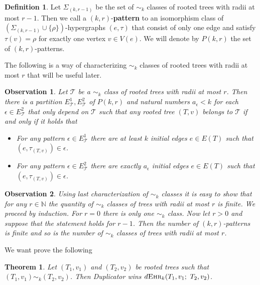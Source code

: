 \documentclass[12pt,notitlepage,a4paper]{article}
\newtheorem{theorem}{Theorem}[section]
\newtheorem{obs}{Observation}[section]
\theoremstyle{definition}
\newtheorem{definition}{Definition}[section]
\newcommand{\N}{\mathbb{N}}
\newcommand{\ehr}{\textsc{Ehr}}
\begin{document}
\begin{definition}
	Let $\Sigma_{(k,r-1)}$ be the set of $\sim_k$ classes
	of rooted trees with radii at most $r-1$. Then
	we call a $(k,r)$-\textbf{pattern} to an isomorphism class
	of $(\Sigma_{(k,r-1)}\cup \{\rho \})$-hypergraphs 
	$(e,\tau)$ that consist of only one edge and satisfy 
	$\tau(v)=\rho$ for exactly one vertex $v\in V(e)$. We will
	denote by $P(k,r)$ the set of $(k,r)$-patterns.
\end{definition}

The following is a way of characterizing $\sim_k$ classes
of rooted trees with radii at most $r$ that will be useful later. 

\begin{obs}\label{obs:equivalenttrees}
Let $\mathcal{T}$ be a $\sim_k$ class of rooted trees with
radii at most $r$. Then there is a partition $E^1_\mathcal{T},
E^2_\mathcal{T}$ of $P(k,r)$ and natural numbers $a_\epsilon<k$
for each $\epsilon\in E^2_\mathcal{T}$ that only depend on 
$\mathcal{T}$ such that any rooted tree $(T,v)$ belongs to
$\mathcal{T}$ if and only if it holds that
\begin{itemize}
	\item[(1)] For any pattern $\epsilon\in E^1_\mathcal{T}$ there are at least
	$k$ initial edges $e\in E(T)$ such that
	$(e,\tau_{(T,v)})\in \epsilon$. 
	\item[(2)] For any pattern $\epsilon\in E^2_\mathcal{T}$ there are exactly
	$a_\epsilon$ initial edges $e\in E(T)$ such that
	$(e,\tau_{(T,v)})\in \epsilon$.	
\end{itemize}
\end{obs}
\begin{obs}\label{obs:finitetrees}
	Using last characterization of $\sim_k$ classes
	it is easy to show that for any $r\in \N$ the quantity
	of $\sim_k$ classes of trees with radii at most $r$ is finite. 
	We proceed by induction. For $r=0$ there is only one $\sim_k$ class.
	Now let $r>0$ and suppose that the statement holds for $r-1$. Then
	the number of $(k,r)$-patterns is finite and so is the number
	of $\sim_k$ classes of trees with radii at most $r$. 
\end{obs}


We want prove the following
\begin{theorem} \label{thm:equivalenttrees} 
	Let $(T_1,v_1)$ and $(T_2,v_2)$ be rooted trees such
	that $(T_1,v_1)\sim_k (T_2,v_2)$.
	Then Duplicator wins
	$d\ehr_{k}(T_1,v_1;\, \, T_2,v_2)$.
\end{theorem}
\end{document}
